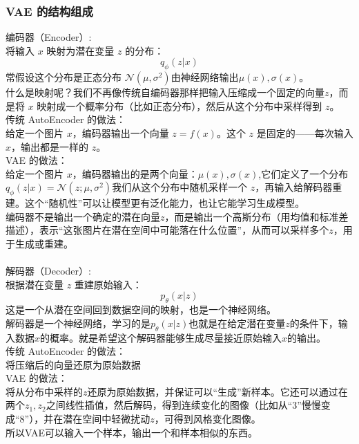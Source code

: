 \documentclass[final]{ws-ijseke}
\begin{document}
\subsubsection{VAE 的结构组成}
编码器（Encoder）:\\
\hspace*{2em} 将输入 $x$ 映射为潜在变量 $z$ 的分布：
\begin{equation*}
q_\phi(z|x)
\end{equation*}
常假设这个分布是正态分布 $\mathcal N(\mu,\sigma^2)$由神经网络输出$\mu(x),\sigma(x)$。 \\
\hspace*{2em}什么是映射呢？我们不再像传统自编码器那样把输入压缩成一个固定的向量$z$，而是将 $x$ 映射成一个概率分布（比如正态分布），然后从这个分布中采样得到 $z$。\\
传统 AutoEncoder 的做法：\\
\hspace*{2em} 给定一个图片 $x$，编码器输出一个向量 $z = f(x)$。这个 $z$ 是固定的——每次输入 $x$，输出都是一样的 $z$。\\
VAE 的做法：\\
\hspace*{2em} 给定一个图片 $x$，编码器输出的是两个向量：$\mu(x),\sigma(x)$,它们定义了一个分布$q_\phi(z|x) = \mathcal N(z;\mu,\sigma^2)$我们从这个分布中随机采样一个 $z$，再输入给解码器重建。这个“随机性”可以让模型更有泛化能力，也让它能学习生成模型。\\
\hspace*{2em} 编码器不是输出一个确定的潜在向量$z$，而是输出一个高斯分布（用均值和标准差描述），表示“这张图片在潜在空间中可能落在什么位置”，从而可以采样多个$z$，用于生成或重建。\\\\
解码器（Decoder）:\\
根据潜在变量 $z$ 重建原始输入：
\begin{equation*}
p_\theta(x|z)
\end{equation*}
\hspace*{2em} 这是一个从潜在空间回到数据空间的映射，也是一个神经网络。\\
\hspace*{2em} 解码器是一个神经网络，学习的是$p_\theta(x|z)$也就是在给定潜在变量$z$的条件下，输入数据$x$的概率。就是希望这个解码器能够生成尽量接近原始输入$x$的输出。\\
传统 AutoEncoder 的做法：\\
\hspace*{2em} 将压缩后的向量还原为原始数据\\
VAE 的做法：\\
\hspace*{2em} 将从分布中采样的$z$还原为原始数据，并保证可以“生成”新样本。它还可以通过在两个$z_1,z_2$之间线性插值，然后解码，得到连续变化的图像（比如从“3”慢慢变成“8”），并在潜在空间中轻微扰动$z$，可得到风格变化图像。\\
\hspace*{2em} 所以VAE可以输入一个样本，输出一个和样本相似的东西。
\end{document}
